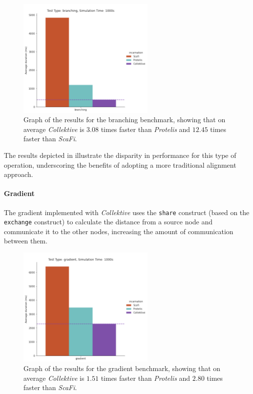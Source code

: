 \begin{figure}[ht!]
    \centering
    \includegraphics[width=0.6\textwidth]{figures/branching-results}
    \caption{Graph of the results for the branching benchmark, showing that on average \emph{Collektive} is $3.08$ times faster
    than \emph{Protelis} and $12.45$ times faster than \emph{ScaFi}.}
    \label{fig:branching}
\end{figure}

The results depicted in  illustrate the disparity in performance for this type of operation,
underscoring the benefits of adopting a more traditional alignment approach.

\paragraph{Gradient}
The gradient implemented with \emph{Collektive} uses the \texttt{share} construct (based on the \texttt{exchange} construct) to
calculate the distance from a source node and communicate it to the other nodes, increasing the amount of communication between them.

\begin{figure}[ht!]
    \centering
    \includegraphics[width=0.6\textwidth]{figures/gradient-results}
    \caption{Graph of the results for the gradient benchmark, showing that on average \emph{Collektive} is $1.51$ times faster
    than \emph{Protelis} and $2.80$ times faster than \emph{ScaFi}.}
    \label{fig:gradient-resutls}
\end{figure}

